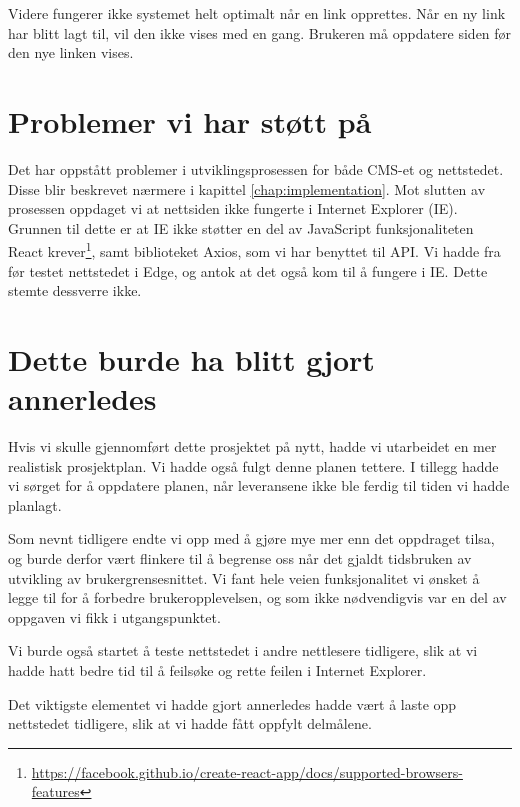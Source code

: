 Videre fungerer ikke systemet helt optimalt når en link opprettes. Når en ny link har blitt lagt til, vil den ikke vises med en gang. Brukeren må oppdatere siden før den nye linken vises.

\section{Problemer vi har støtt på}
Det har oppstått problemer i utviklingsprosessen for både CMS-et og nettstedet. Disse blir beskrevet nærmere i kapittel \ref{chap:implementation}. Mot slutten av prosessen oppdaget vi at nettsiden ikke fungerte i Internet Explorer (IE). Grunnen til dette er at IE ikke støtter en del av JavaScript funksjonaliteten React krever\footnote{\url{https://facebook.github.io/create-react-app/docs/supported-browsers-features}}, samt biblioteket Axios, som vi har benyttet til API. Vi hadde fra før testet nettstedet i Edge, og antok at det også kom til å fungere i IE. Dette stemte dessverre ikke.

\section{Dette burde ha blitt gjort annerledes}
Hvis vi skulle gjennomført dette prosjektet på nytt, hadde vi utarbeidet en mer realistisk prosjektplan. Vi hadde også fulgt denne planen tettere. I tillegg hadde vi sørget for å oppdatere planen, når leveransene ikke ble ferdig til tiden vi hadde planlagt.

Som nevnt tidligere endte vi opp med å gjøre mye mer enn det oppdraget tilsa, og burde derfor vært flinkere til å begrense oss når det gjaldt tidsbruken av utvikling av brukergrensesnittet. Vi fant hele veien funksjonalitet vi ønsket å legge til for å forbedre brukeropplevelsen, og som ikke nødvendigvis var en del av oppgaven vi fikk i utgangspunktet. 

Vi burde også startet å teste nettstedet i andre nettlesere tidligere, slik at vi hadde hatt bedre tid til å feilsøke og rette feilen i Internet Explorer.

Det viktigste elementet vi hadde gjort annerledes hadde vært å laste opp nettstedet tidligere, slik at vi hadde fått oppfylt delmålene. 
